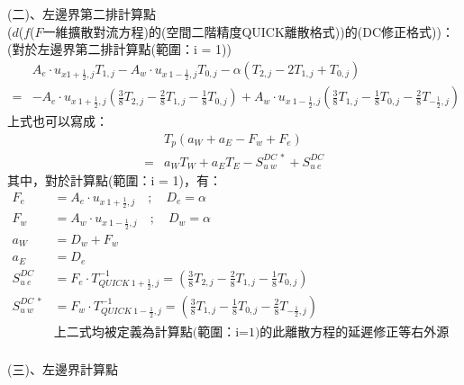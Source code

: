 \documentclass[12pt]{article}
\begin{document}
\noindent (二)、左邊界第二排計算點\\

\noindent ($d$($f$($F$一維擴散對流方程)的(空間二階精度QUICK離散格式))的(DC修正格式))：(對於左邊界第二排計算點(範圍：i = 1))
\begin{equation}
    \begin{split}
        &A_{e}\cdot u_{x 1+\frac{1}{2},j}T_{1,j}-A_{w}\cdot u_{x\ 1-\frac{1}{2},j}T_{0,j} - \alpha(T_{2,j}-2T_{1,j}+T_{0,j})\\
        =& -A_{e} \cdot u_{x\ 1+\frac{1}{2},j}(\frac{3}{8}T_{2,j} - \frac{2}{8}T_{1,j} - \frac{1}{8}T_{0,j})+A_{w}\cdot u_{x\ 1-\frac{1}{2},j}(\frac{3}{8}T_{1,j} - \frac{1}{8}T_{0,j} - \frac{2}{8}T_{-\frac{1}{2},j})
    \end{split}
\end{equation}
\noindent 上式也可以寫成：\\
\begin{equation}
    \begin{split}
        &T_{p}(a_{W} + a_{E} - F_{w} + F_{e})\\
         = &a_{W}T_{W} + a_{E}T_{E} - S_{u\ w}^{DC\ *} + S_{u\ e}^{DC}
    \end{split}
\end{equation}
其中，對於計算點(範圍：i = 1)，有：
\begin{equation}
\begin{split}
    F_{e} &= A_{e}\cdot u_{x\ 1+\frac{1}{2},j} \quad;\quad D_{e} = \alpha\\
    F_{w} &= A_{w}\cdot u_{x\ 1-\frac{1}{2},j} \quad;\quad D_{w} = \alpha\\
    a_{W} &= D_{w} + F_{w} \\
    a_{E} &= D_{e}\\
    S_{u\ e}^{DC} &= F_{e}\cdot T_{QUICK\ 1+\frac{1}{2},j}^{-1} = (\frac{3}{8}T_{2,j} - \frac{2}{8}T_{1,j} - \frac{1}{8}T_{0,j})\\
    S_{u\ w}^{DC\ *} &= F_{w}\cdot T_{QUICK\ 1-\frac{1}{2},j}^{-1} = (\frac{3}{8}T_{1,j} - \frac{1}{8}T_{0,j} - \frac{2}{8}T_{-\frac{1}{2},j}) \\
    &\mbox{上二式均被定義為計算點(範圍：i=1)的此離散方程的延遲修正等右外源項}\\
\end{split}
\end{equation}

\noindent (三)、左邊界計算點\\
\end{document}

